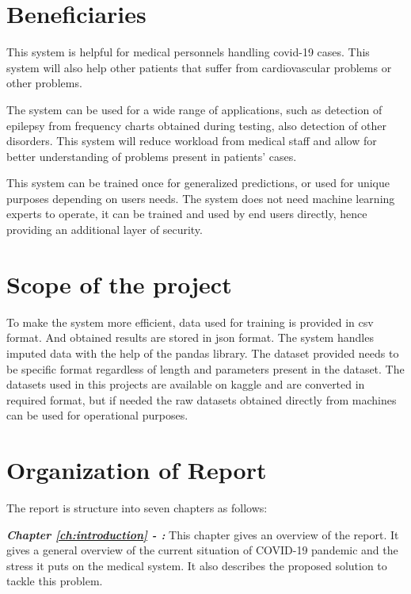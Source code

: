 \section{Beneficiaries} \label{sec:beneficiaries}

This system is helpful for medical personnels handling covid-19 cases. This system will also help other patients that suffer from cardiovascular problems or other problems.

The system can be used for a wide range of applications, such as detection of epilepsy from frequency charts obtained during testing, also detection of other disorders. This system will reduce workload from medical staff and allow for better understanding of problems present in patients' cases.

This system can be trained once for generalized predictions, or used for unique purposes depending on users needs. The system does not need machine learning experts to operate, it can be trained and used by end users directly, hence providing an additional layer of security.

\section{Scope of the project} \label{sec:scope_of_the_project}

To make the system more efficient, data used for training is provided in csv format. And obtained results are stored in json format. The system handles imputed data with the help of the pandas library. The dataset provided needs to be specific format regardless of length and parameters present in the dataset. The datasets used in this projects are available on kaggle and are converted in required format, but if needed the raw datasets obtained directly from machines can be used for operational purposes.

\section{Organization of Report} \label{sec:organization_of_report}

The report is structure into seven chapters as follows:

\textbf{\textit{Chapter \ref{ch:introduction} - :}}
This chapter gives an overview of the report. It gives a general overview of the current situation of COVID-19 pandemic and the stress it puts on the medical system. It also describes the proposed solution to tackle this problem.

